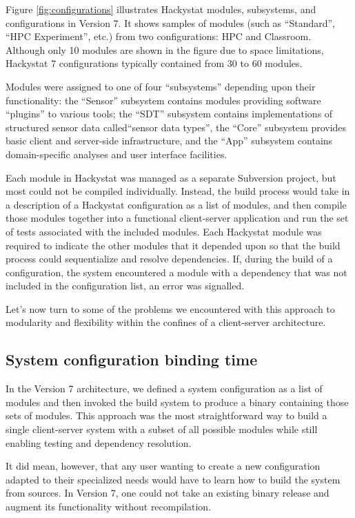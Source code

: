 \documentclass[conference,compsoc]{IEEEtran}
\begin{document}
Figure \ref{fig:configurations} illustrates Hackystat modules, subsystems,
and configurations in Version 7.  It shows samples of modules (such as
``Standard'', ``HPC Experiment'', etc.) from two configurations: HPC and
Classroom.  Although only 10 modules are shown in the figure due to space
limitations, Hackystat 7 configurations typically contained from 30 to 60
modules.


Modules were assigned to one of four ``subsystems'' depending upon their
functionality: the ``Sensor'' subsystem contains modules providing software
``plugins'' to various tools; the ``SDT'' subsystem contains
implementations of structured sensor data called``sensor data types'', the
``Core'' subsystem provides basic client and server-side infrastructure,
and the ``App'' subsystem contains domain-specific analyses and user
interface facilities.


Each module in Hackystat was managed as a separate Subversion project, but
most could not be compiled individually. Instead, the build process would
take in a description of a Hackystat configuration as a list of modules,
and then compile those modules together into a functional client-server
application and run the set of tests associated with the included modules.
Each Hackystat module was required to indicate the other modules that it
depended upon so that the build process could sequentialize and resolve
dependencies.  If, during the build of a configuration, the system
encountered a module with a dependency that was not included in the
configuration list, an error was signalled.

Let's now turn to some of the problems we encountered with this approach to
modularity and flexibility within the confines of a client-server
architecture.

\subsection{System configuration binding time}

In the Version 7 architecture, we defined a system configuration as a list
of modules and then invoked the build system to produce a binary containing
those sets of modules.  This approach was the most straightforward way to
build a single client-server system with a subset of all possible modules
while still enabling testing and dependency resolution.

It did mean, however, that any user wanting to create a new configuration
adapted to their specialized needs would have to learn how to build the
system from sources. In Version 7, one could not take an existing binary
release and augment its functionality without recompilation. 
\end{document}
